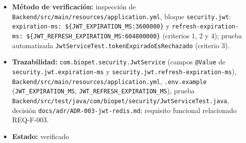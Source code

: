 \documentclass[
  spanish,
]{article}
\providecommand{\tightlist}{%
  \setlength{\itemsep}{0pt}\setlength{\parskip}{0pt}}
\begin{document}
\begin{itemize}
  \begin{enumerate}
  \def\labelenumi{\arabic{enumi}.}
  \tightlist
  \item
    Los valores por defecto configurados son 3 600 000 ms (1 hora) para
    el access token y 604 800 000 ms (7 días) para el refresh token.
  \item
    Ambos valores se leen de variables de entorno y pueden
    sobrescribirse sin recompilar.
  \item
    Un token cuyo \texttt{exp} ya pasó es rechazado por el servicio de
    validación.
  \item
    El código fuente no contiene ninguno de esos dos valores
    literalmente escrito en una clase Java.
  \end{enumerate}
\item
  \textbf{Método de verificación:} inspección de
  \texttt{Backend/\allowbreak{}src/\allowbreak{}main/\allowbreak{}resources/\allowbreak{}application.\allowbreak{}yml}, bloque
  \texttt{security.\allowbreak{}jwt}:
  \texttt{expiration-\allowbreak{}ms:\ \$\{JWT\_\allowbreak{}EXPIRATION\_\allowbreak{}M\allowbreak{}S:3600000\}} y
  \texttt{refresh-\allowbreak{}expiration-\allowbreak{}ms:\ \$\{JWT\_\allowbreak{}REFRESH\_\allowbreak{}EXP\allowbreak{}IRATION\_\allowbreak{}MS:604800\allowbreak{}000\}}
  (criterios 1, 2 y 4); prueba automatizada
  \texttt{Jwt\allowbreak{}Service\allowbreak{}Test.\allowbreak{}token\allowbreak{}Expirado\allowbreak{}Es\allowbreak{}Rechazado} (criterio 3).
\item
  \textbf{Trazabilidad:} \texttt{com.\allowbreak{}biopet.\allowbreak{}security.\allowbreak{}Jwt\allowbreak{}Service} (campos
  \texttt{@Value} de \texttt{security.\allowbreak{}jwt.\allowbreak{}expiration-\allowbreak{}ms} y
  \texttt{security.\allowbreak{}jwt.\allowbreak{}refresh-\allowbreak{}expiration-\allowbreak{}ms}),
  \texttt{Backend/\allowbreak{}src/\allowbreak{}main/\allowbreak{}resources/\allowbreak{}application.\allowbreak{}yml},
  \texttt{.\allowbreak{}env.\allowbreak{}example} (\texttt{JWT\_\allowbreak{}EXPIRATION\_\allowbreak{}MS},
  \texttt{JWT\_\allowbreak{}REFRESH\_\allowbreak{}EXPIRA\allowbreak{}TION\_\allowbreak{}MS}), prueba
  \texttt{Backend/\allowbreak{}src/\allowbreak{}test/\allowbreak{}java/\allowbreak{}com/\allowbreak{}biopet/\allowbreak{}security/\allowbreak{}Jwt\allowbreak{}Service\allowbreak{}Test.\allowbreak{}java},
  decisión \texttt{docs/\allowbreak{}adr/\allowbreak{}ADR-\allowbreak{}003-\allowbreak{}jwt-\allowbreak{}redis.\allowbreak{}md}; requisito funcional
  relacionado REQ-F-003.
\item
  \textbf{Estado:} verificado
\end{itemize}
\end{document}
